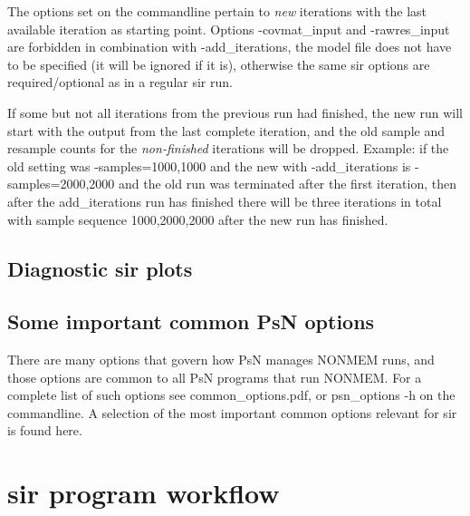 \begin{optionlist}
The options set on the commandline 
pertain to \emph{new} iterations with the last available iteration as starting point.
Options -covmat\_input and -rawres\_input are forbidden in combination with -add\_iterations, 
the model file does not have to be specified (it will be ignored if it is),
otherwise the same sir options are required/optional as in a regular sir run.

If some but not all iterations from the previous run had finished, the new run will start with the output
from the last complete iteration, and the old sample and resample counts for
the \emph{non-finished} iterations will be dropped. Example: if the old setting was -samples=1000,1000
and the new with -add\_iterations 
is -samples=2000,2000 and the old run was terminated after the first iteration,
then after the add\_iterations run has finished
there will be three iterations in total with sample sequence 1000,2000,2000 
after the new run has finished.

\nextopt
\end{optionlist}


\subsection{Diagnostic sir plots}
\newcommand{\rplotsconditions}{
See section Output, subsections Basic and Extended diagnostic plots,
for descriptions of the default sir plots.
The default sir template 
requires 
that R libraries
gplots, ggplot2, plyr, dplyr, reshape, gridExtra, RColorBrewer, tidyr, MCMCpack and stats4 are installed.
If the conditions are not fulfilled then no pdf will be generated,
see the .Rout file in the main run directory for error messages.
}



 

\subsection{Some important common PsN options}
There are many options that govern how PsN manages NONMEM runs, and
those options are common to all PsN programs that run NONMEM.
For a complete list of such options see common\_options.pdf, 
or psn\_options -h on the commandline. A selection of
the most important common options relevant for sir is found here.



\section{sir program workflow}
